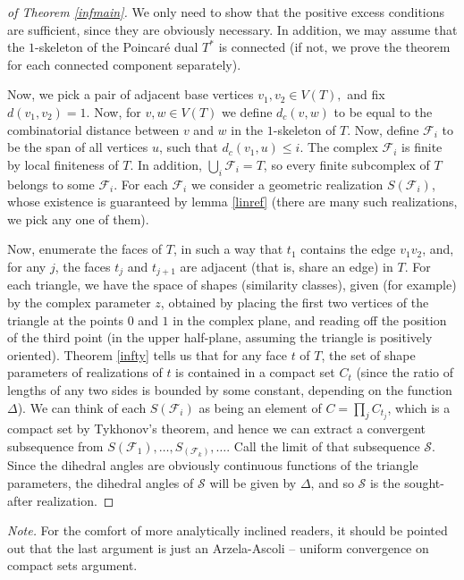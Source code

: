 \documentclass{acmart}
\begin{document}
\begin{proof}[of Theorem \ref{infmain}]
We only need to show that the positive excess conditions are
sufficient, since they are obviously necessary. In addition, we may
assume that the $1$-skeleton of the Poincar\'e dual $T^*$ is connected
(if not, we prove the theorem for each connected component
separately).

Now, we pick a pair of adjacent base vertices $v_1, v_2 \in V(T),$ and
fix $d(v_1, v_2) = 1$. Now, for $v, w \in V(T)$ we define $d_c(v, w)$ to
be equal to the combinatorial distance between $v$ and $w$ in the
$1$-skeleton of $T$. Now, define $\mathcal{F}_i$ to be the span of all
vertices $u$, such that $d_c(v_1, u) \leq i$. The complex $\mathcal{F}_i$ is 
finite by local finiteness of $T$. In addition, $\bigcup_i
\mathcal{F}_i = T$, so every finite subcomplex of $T$ belongs to some
$\mathcal{F}_i$. For each $\mathcal{F}_i$ we consider a geometric
realization $S(\mathcal{F}_i)$, whose existence is guaranteed by lemma
\ref{linref} (there are many such realizations, we pick any one of them).

Now, enumerate the faces of $T$, in such a way that $t_1$ contains the
edge $v_1 v_2$, and, for any $j$, the faces $t_j$ and $t_{j+1}$ are
adjacent (that is, share an edge) in $T$. For each triangle, we have
the space of shapes (similarity classes), given (for example) by the
complex parameter $z$, obtained by placing the first two vertices of
the triangle at the points $0$ and $1$ in the complex plane, and
reading off the position of the third point (in the upper half-plane,
assuming the triangle is positively oriented). Theorem \ref{infty}
tells us that for any face $t$ of $T$, the set of shape parameters of
realizations of $t$ is contained in a compact set $C_t$ (since the
ratio of lengths of any two sides is bounded by some constant,
depending on the function $\Delta$). We can think of
each $S(\mathcal{F}_i)$ as being an element of $C = \prod_j C_{t_j}$,
which is a compact set by Tykhonov's theorem, and hence we can extract
a convergent subsequence from $S(\mathcal{F}_1), \ldots,
S_(\mathcal{F}_k), \ldots$. Call the limit of that subsequence
$\mathcal{S}$. Since the dihedral angles are obviously continuous
functions of the triangle parameters, the dihedral angles of
$\mathcal{S}$ will be given by $\Delta$, and so $\mathcal{S}$ is the
sought-after realization.
\end{proof}

\medskip\noindent
\textit{Note.} For the comfort of more analytically inclined readers,
it should be pointed out that the last argument is just an
Arzela-Ascoli -- uniform convergence on compact sets argument.
\end{document}
